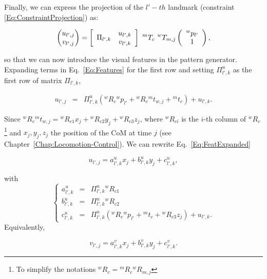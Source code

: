 Finally, we can express the projection of the $l'-th$ landmark (constraint \ref{Eq:ConstraintProjection}) as:

\begin{equation}
\label{Eq:Features}
 \left(
 \begin{matrix}
  u_{l',j} \\
  v_{l',j}
 \end{matrix}
 \right) = 
\left[
\begin{array}{cc}
\multirow{2}{*}{$\Pi_{l',k}$} & u_{l',k} \\
& v_{l',k} \\
\end{array}
\right]
 \ ^mT_c \ ^wT_{m,j} \left( \begin{array}{c}
 ^{w}p_{l'}\\
 1
 \end{array}\right),
\end{equation}

\noindent so that we can now introduce the visual features in the pattern generator. Expanding terms in Eq.~\ref{Eq:Features} for the first row and setting $\Pi^u_{l',k}$ as the first row of matrix $\Pi_{l',k}$,

\begin{eqnarray}
\label{Eq:FeatExpanded}
 u_{l',j} &= &\Pi^u_{l',k} (^wR_c {^wp_{l'}} + {^wR_c} {^mt_{w,j}} + {^mt_c}) + u_{l',k}.
\end{eqnarray}

Since $^wR_c {^mt_{w,j}} = {^wR_{c1}} x_j + {^wR_{c2}} y_j + {^wR_{c3}} z_j$, where $^wR_{ci}$ is the $i$-th column of $^wR_c$
\footnote{To simplify the notations ${^wR_c}={^mR_c}{^wR_{m,j}}$}
and $x_j,y_j,z_j$ the position of the CoM at time $j$ (see Chapter~\ref{Chap:Locomotion-Control}). We can rewrite Eq.~\ref{Eq:FeatExpanded}

\begin{equation}
\label{Eq:FeaturesUReduced}
 u_{l',j} = a^u_{l',k} x_j + b^u_{l',k} y_j + c^u_{l',k},
\end{equation}

\noindent with 
$$
\left\{
\begin{array}{ccl}
a^u_{l',k} & = & \Pi^u_{l',k} {^wR_{c1}}\\
b^u_{l',k} & = & \Pi^u_{l',k} {^wR_{c2}}\\
c^u_{l',k} & = & \Pi^u_{l',k} ({^wR_c} {^wp_{l'}} + {^mt_c} + {^wR_{c3}} z_j) + u_{l',k}.
\end{array}
\right.
$$
Equivalently,

\begin{equation}
\label{Eq:FeaturesVReduced}
  v_{l',j} = a^v_{l',k} x_j + b^v_{l',k} y_j + c^v_{l',k}.
\end{equation}

